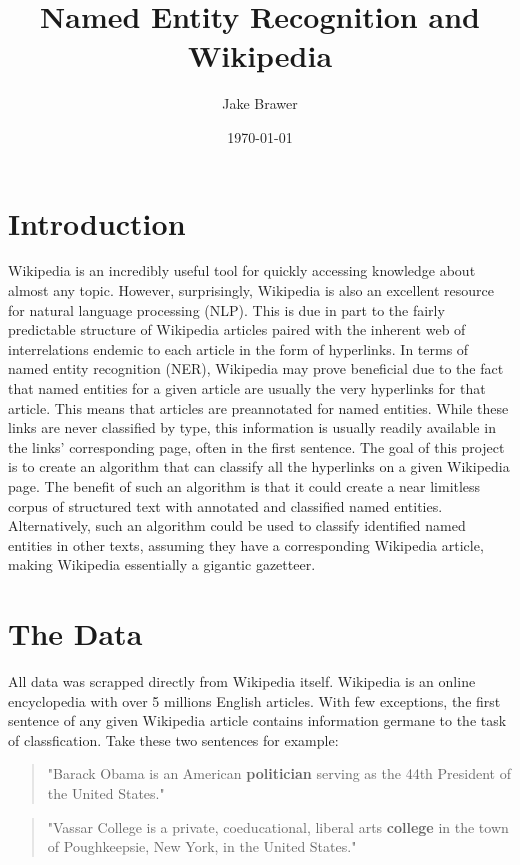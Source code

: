 \documentclass[12pt]{article}
\author{Jake Brawer}
\date{\today}
\title{Named Entity Recognition and Wikipedia}
\begin{document}
\maketitle
\section{Introduction}
\label{sec:orgheadline1}

Wikipedia is an incredibly useful tool for quickly accessing knowledge about almost any topic. However, surprisingly, Wikipedia is also an excellent resource for natural language processing (NLP). This is due in part to the fairly predictable structure of Wikipedia articles paired with the inherent web of interrelations endemic to each article in the form of hyperlinks. In terms of named entity recognition (NER), Wikipedia may prove beneficial due to the fact that named entities for a given article are usually the very hyperlinks for that article. This means that articles are preannotated for named entities. While these links are never classified by type, this information is usually readily available in the links' corresponding page, often in the first sentence. The goal of this project is to create an algorithm that can classify all the hyperlinks on a given Wikipedia page. The benefit of such an algorithm is that it could create a near limitless corpus of structured text with annotated and classified named entities. Alternatively, such an algorithm could be used to classify identified named entities in other texts, assuming they have a corresponding Wikipedia article, making Wikipedia essentially a gigantic gazetteer.

\section{The Data}
\label{sec:orgheadline2}

All data was scrapped directly from Wikipedia itself. Wikipedia is an online encyclopedia with over 5 millions English articles. With few exceptions, the first sentence of any given Wikipedia article contains information germane to the task of classfication. Take these two sentences for example: 
\begin{quote}
"Barack Obama is an American \textbf{politician} serving as the 44th President of the United States."
\end{quote}

\begin{quote}
"Vassar College is a private, coeducational, liberal arts \textbf{college} in the town of Poughkeepsie, New York, in the United States."
\end{quote}
\end{document}
